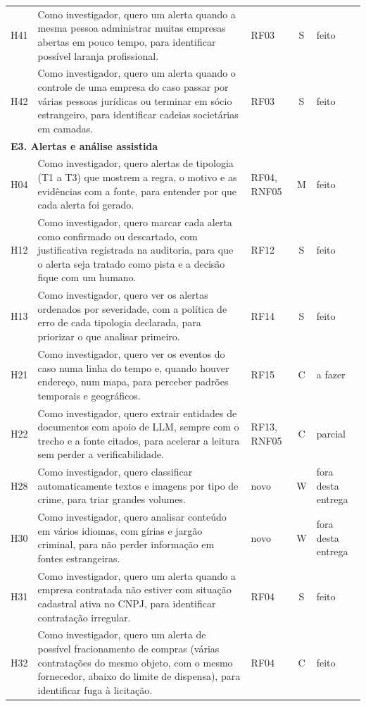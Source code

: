 \begin{small}
\begin{longtable}{lp{7.9cm}p{1.3cm}cp{1.9cm}}
H41 & Como investigador, quero um alerta quando a mesma pessoa administrar muitas empresas abertas em pouco tempo, para identificar possível laranja profissional. & RF03 & S & feito \\
H42 & Como investigador, quero um alerta quando o controle de uma empresa do caso passar por várias pessoas jurídicas ou terminar em sócio estrangeiro, para identificar cadeias societárias em camadas. & RF03 & S & feito \\
\multicolumn{5}{l}{\textbf{E3. Alertas e análise assistida}} \\
H04 & Como investigador, quero alertas de tipologia (T1 a T3) que mostrem a regra, o motivo e as evidências com a fonte, para entender por que cada alerta foi gerado. & RF04, RNF05 & M & feito \\
H12 & Como investigador, quero marcar cada alerta como confirmado ou descartado, com justificativa registrada na auditoria, para que o alerta seja tratado como pista e a decisão fique com um humano. & RF12 & S & feito \\
H13 & Como investigador, quero ver os alertas ordenados por severidade, com a política de erro de cada tipologia declarada, para priorizar o que analisar primeiro. & RF14 & S & feito \\
H21 & Como investigador, quero ver os eventos do caso numa linha do tempo e, quando houver endereço, num mapa, para perceber padrões temporais e geográficos. & RF15 & C & a fazer \\
H22 & Como investigador, quero extrair entidades de documentos com apoio de LLM, sempre com o trecho e a fonte citados, para acelerar a leitura sem perder a verificabilidade. & RF13, RNF05 & C & parcial \\
H28 & Como investigador, quero classificar automaticamente textos e imagens por tipo de crime, para triar grandes volumes. & novo & W & fora desta entrega \\
H30 & Como investigador, quero analisar conteúdo em vários idiomas, com gírias e jargão criminal, para não perder informação em fontes estrangeiras. & novo & W & fora desta entrega \\
H31 & Como investigador, quero um alerta quando a empresa contratada não estiver com situação cadastral ativa no CNPJ, para identificar contratação irregular. & RF04 & S & feito \\
H32 & Como investigador, quero um alerta de possível fracionamento de compras (várias contratações do mesmo objeto, com o mesmo fornecedor, abaixo do limite de dispensa), para identificar fuga à licitação. & RF04 & C & feito \\

\end{longtable}
\end{small}
